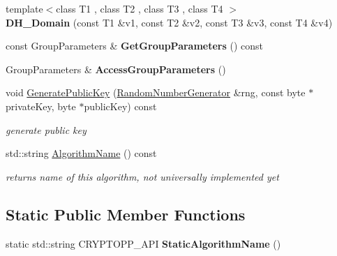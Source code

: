 \begin{DoxyCompactItemize}
\item 
\hypertarget{class_d_h___domain_abf7459a664fb0e76a1660ef13766b556}{
{\footnotesize template$<$class T1 , class T2 , class T3 , class T4 $>$ }\\{\bfseries DH\_\-Domain} (const T1 \&v1, const T2 \&v2, const T3 \&v3, const T4 \&v4)}
\label{class_d_h___domain_abf7459a664fb0e76a1660ef13766b556}

\item 
\hypertarget{class_d_h___domain_a5f8c309e388c6ce650fc62d7dcc2f35f}{
const GroupParameters \& {\bfseries GetGroupParameters} () const }
\label{class_d_h___domain_a5f8c309e388c6ce650fc62d7dcc2f35f}

\item 
\hypertarget{class_d_h___domain_aabb5b554448e060efb45b342205179e7}{
GroupParameters \& {\bfseries AccessGroupParameters} ()}
\label{class_d_h___domain_aabb5b554448e060efb45b342205179e7}

\item 
void \hyperlink{class_d_h___domain_ab1fd61cdab38427665d83a4c37e66083}{GeneratePublicKey} (\hyperlink{class_random_number_generator}{RandomNumberGenerator} \&rng, const byte $\ast$privateKey, byte $\ast$publicKey) const 
\begin{DoxyCompactList}\small\item\em generate public key \item\end{DoxyCompactList}\item 
\hypertarget{class_d_h___domain_a5e5b913dda2aec9e424d9d2bc63140d7}{
std::string \hyperlink{class_d_h___domain_a5e5b913dda2aec9e424d9d2bc63140d7}{AlgorithmName} () const }
\label{class_d_h___domain_a5e5b913dda2aec9e424d9d2bc63140d7}

\begin{DoxyCompactList}\small\item\em returns name of this algorithm, not universally implemented yet \item\end{DoxyCompactList}\end{DoxyCompactItemize}
\subsection*{Static Public Member Functions}
\begin{DoxyCompactItemize}
\item 
\hypertarget{class_d_h___domain_aa0f5306c465b366f91b0b7593e9b364e}{
static std::string CRYPTOPP\_\-API {\bfseries StaticAlgorithmName} ()}
\label{class_d_h___domain_aa0f5306c465b366f91b0b7593e9b364e}

\end{DoxyCompactItemize}


